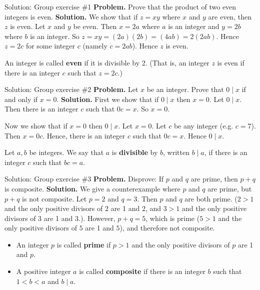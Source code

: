 \documentclass[10pt]{beamer}
\begin{document}
\begin{frame}{Solution: Group exercise \#1}
\textbf{Problem.} Prove that the product of two even integers is even.
\vfill 
\textbf{Solution.}   We show that if $z=xy$ where $x$ and $y$ are even, then $z$ is even.   Let $x$ and $y$ be even.  Then $x=2a$ where $a$ is an integer and $y=2b$ where $b$ is an integer.  So $z=xy=(2a)(2b)=(4ab)=2(2ab)$. Hence $z=2c$ for some integer $c$ (namely $c= 2ab$).  Hence $z$ is even. 

\vfill
\begin{mygreenbox}[title={Reference: Definition}]
An integer is called \textbf{even} if it is divisible by 2. (That is, an integer $z$ is even if there is an integer $c$ such that $z=2c$.)
\end{mygreenbox}

\end{frame}

\begin{frame}{Solution: Group exercise \#2}
\textbf{Problem.} Let $x$ be an integer. Prove that $0 \mid x$ if and only if $x=0$.
\vfill 
\textbf{Solution.}  First we show that if $0 \mid x$ then $x=0$.  Let $0 \mid x$. Then there is an integer $c$ such that $0c=x$.  So $x=0$.

Now we show that if $x=0$ then $0 \mid x$.  Let $x=0$.  Let $c$ be any integer (e.g. $c=7$).  Then $x=0c$. Hence, there is an integer $c$ such that $0c=x$.  Hence $0 \mid x$. 

\vfill
\begin{mygreenbox}[title={Reference: Definition}]
Let $a,b$ be integers.  We say that $a$ is \textbf{divisible} by $b$, written $b \mid a$, if there is an integer $c$ such that $bc=a$. 
\end{mygreenbox}

\end{frame}



\begin{frame}{Solution: Group exercise \#3 }
\textbf{Problem.} Disprove: If $p$ and $q$ are prime, then $p+q$ is composite.
	\vfill
\textbf{Solution.} We give a counterexample where $p$ and $q$ are prime, but $p+q$ is not composite.  Let $p=2$ and $q=3$.  Then $p$ and $q$ are both prime. ($2>1$ and the only positive divisors of $2$ are 1 and $2$, and  $3>1$ and the only positive divisors of $3$ are 1 and $3$.). However, $p+q=5$, which is prime  ($5>1$ and the only positive divisors of $5$ are 1 and $5$), and therefore not composite.
\vfill 
\begin{mygreenbox}[title={Reference: Definitions}]
\begin{itemize}
	\item An integer $p$ is called \textbf{prime} if $p>1$ and the only positive divisors of $p$ are 1 and $p$.
	\item A positive integer $a$ is called \textbf{composite} if there is an integer $b$ such that  $1<b<a$ and $b \mid a$.
\end{itemize}
	
\end{mygreenbox}

\end{frame}
\end{document}
